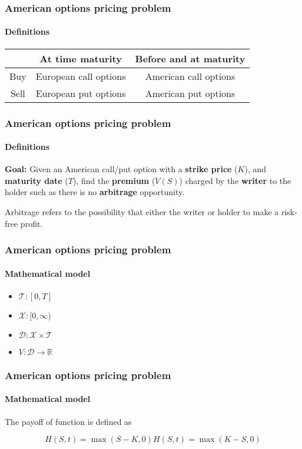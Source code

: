 \documentclass{beamer}
\begin{document}
\begin{frame}
    \frametitle{American options pricing problem}
    \framesubtitle{Definitions}
    \centering
    \begin{tabular}{ |c|c|c| }
        \hline
            & At time maturity & Before and at maturity \\ \hline
        Buy & European call options & American call options \\  \hline
        Sell & European put options & American put options \\ \hline
    \end{tabular}
\end{frame} 

\begin{frame}
    \frametitle{American options pricing problem}
    \framesubtitle{Definitions}
    \textbf{Goal:}
    Given an American call/put option with a \textbf{strike price} ($K$), 
    and \textbf{maturity date} ($T$), find the \textbf{premium} ($V(S)$) charged 
    by the \textbf{ writer} to the holder such as there is no \textbf{arbitrage} 
    opportunity.

    Arbitrage refers to the possibility that either the writer or holder to make a risk-free profit. 
\end{frame}

\begin{frame}
    \frametitle{American options pricing problem}
    \framesubtitle{Mathematical model}
    \begin{itemize}
        \item $\mathcal{T}: [0, T]$
        \item $\mathcal{X}: [0, \infty)$
        \item $\mathcal{D}: \mathcal{X}\times\mathcal{T}$
        \item $V: \mathcal{D} \rightarrow \mathbb{R}$
    \end{itemize}
\end{frame}

\begin{frame}
    \frametitle{American options pricing problem}
    \framesubtitle{Mathematical model}
    The payoff of function is defined as

    \begin{subequations}
        \begin{equation}
            H(S, t) = \max(S - K, 0)
        \end{equation}
        \begin{equation}
            H(S, t) = \max(K-S, 0)
        \end{equation}
    \end{subequations}
\end{frame}
\end{document}
